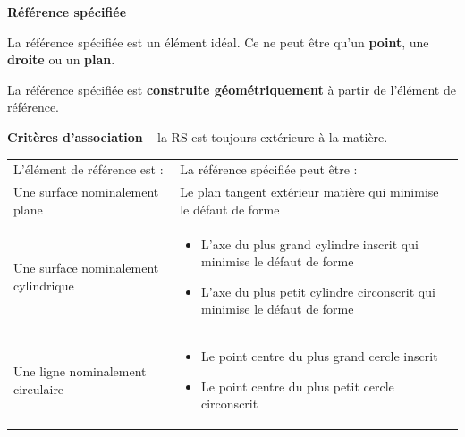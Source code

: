 \documentclass[11pt,oneside]{article}
\begin{document}
\begin{defi}
\textbf{Référence spécifiée}

La référence spécifiée est un élément idéal. Ce ne peut être qu'un \textbf{point}, une \textbf{droite} ou un \textbf{plan}.

La référence spécifiée est \textbf{construite géométriquement} à partir de l'élément de référence. 
\end{defi}

\begin{rem}
\textbf{Critères d'association} -- la RS est toujours extérieure à la matière.

\begin{center}
\begin{tabular}{p{} p{}}
L'élément de référence est : & La référence spécifiée peut être :\\
Une surface nominalement plane & Le plan tangent extérieur matière qui  minimise le défaut de forme \\
Une surface nominalement cylindrique & 
\begin{itemize}
\item L'axe du plus grand cylindre inscrit qui minimise le défaut de forme
\item L'axe du plus petit cylindre circonscrit qui minimise le défaut de forme
\end{itemize}
\\
Une ligne nominalement circulaire & 
\begin{itemize}
\item Le point centre du plus grand cercle inscrit
\item Le point centre du plus petit cercle circonscrit
\end{itemize}
\\
\end{tabular}
\end{center}

\end{rem}
\end{document}
